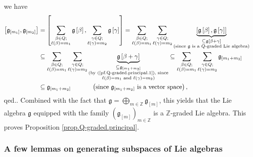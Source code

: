 \documentclass[etingof-lie.tex]{subfiles}
\begin{document}
\begin{verlong}
{we have%
\begin{align*}
\left[  \mathfrak{g}_{\left[  m_{1}\right]  },\mathfrak{g}_{\left[
m_{2}\right]  }\right]   &  =\left[  \sum\limits_{\substack{\beta\in
Q;\\\ell\left(  \beta\right)  =m_{1}}}\mathfrak{g}\left[  \beta\right]
,\sum\limits_{\substack{\gamma\in Q;\\\ell\left(  \gamma\right)  =m_{2}%
}}\mathfrak{g}\left[  \gamma\right]  \right]  =\sum\limits_{\substack{\beta\in
Q;\\\ell\left(  \beta\right)  =m_{1}}}\sum\limits_{\substack{\gamma\in
Q;\\\ell\left(  \gamma\right)  =m_{2}}}\underbrace{\left[  \mathfrak{g}\left[
\beta\right]  ,\mathfrak{g}\left[  \gamma\right]  \right]  }%
_{\substack{\subseteq\mathfrak{g}\left[  \beta+\gamma\right]  \\\text{(since
}\mathfrak{g}\text{ is a }Q\text{-graded Lie algebra)}}}\\
&  \subseteq\sum\limits_{\substack{\beta\in Q;\\\ell\left(  \beta\right)
=m_{1}}}\sum\limits_{\substack{\gamma\in Q;\\\ell\left(  \gamma\right)
=m_{2}}}\underbrace{\mathfrak{g}\left[  \beta+\gamma\right]  }%
_{\substack{\subseteq\mathfrak{g}_{\left[  m_{1}+m_{2}\right]  }\\\text{(by
(\ref{pf.Q-graded.principal.1}), since}\\\ell\left(  \beta\right)
=m_{1}\text{ and }\ell\left(  \gamma\right)  =m_{2}\text{)}}}\subseteq
\sum\limits_{\substack{\beta\in Q;\\\ell\left(  \beta\right)  =m_{1}}%
}\sum\limits_{\substack{\gamma\in Q;\\\ell\left(  \gamma\right)  =m_{2}%
}}\mathfrak{g}_{\left[  m_{1}+m_{2}\right]  }\\
&  \subseteq\mathfrak{g}_{\left[  m_{1}+m_{2}\right]  }%
\ \ \ \ \ \ \ \ \ \ \left(  \text{since }\mathfrak{g}_{\left[  m_{1}%
+m_{2}\right]  }\text{ is a vector space}\right)  ,
\end{align*}
qed.}. Combined with the fact that $\mathfrak{g}=\bigoplus\limits_{m\in
\mathbb{Z}}\mathfrak{g}_{\left[  m\right]  }$, this yields that the Lie
algebra $\mathfrak{g}$ equipped with the family $\left(  \mathfrak{g}_{\left[
m\right]  }\right)  _{m\in\mathbb{Z}}$ is a $\mathbb{Z}$-graded Lie algebra.
This proves Proposition \ref{prop.Q-graded.principal}.
\end{verlong}

\subsubsection{A few lemmas on generating subspaces of Lie algebras}
\end{document}
